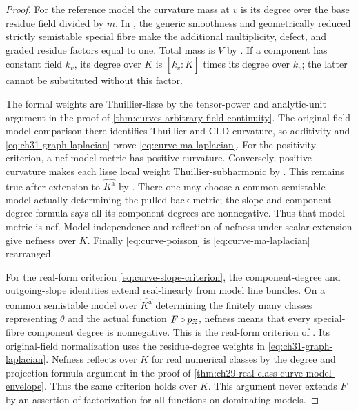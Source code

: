 \begin{proof}
For the reference model the curvature mass at \(v\) is its degree
over the base residue field divided by \(m\).
In \cite[Theorem~18.5.5 and Proposition~18.5.6(a)--(c)]{CLD25},
the generic smoothness and geometrically reduced strictly semistable
special fibre make the additional multiplicity, defect, and graded
residue factors equal to one.  Total mass is \(V\) by
\cite[Theorem~18.3.11]{CLD25}.
If a component has constant field \(k_v\), its degree over
\(\widetilde K\) is \([k_v:\widetilde K]\) times its degree over
\(k_v\); the latter cannot be substituted without this factor.

The formal weights are Thuillier-lisse by the tensor-power and
analytic-unit argument in the proof of
\cref{thm:curves-arbitrary-field-continuity}.
The original-field model comparison there identifies Thuillier and
CLD curvature, so additivity and \eqref{eq:ch31-graph-laplacian}
prove \eqref{eq:curve-ma-laplacian}.
For the positivity criterion, a nef model metric has positive
curvature.  Conversely, positive curvature makes each lisse local
weight Thuillier-subharmonic by \cite[Theorem~3.4.12(ii)]{Thu05}.
This remains true after extension to \(\widehat{K^{\mathrm a}}\)
by \cite[Corollary~3.4.5]{Thu05}.  There one may choose a common
semistable model actually determining the pulled-back metric; the
slope and component-degree formula
\cite[Proposition~3.7]{GJKM19} says all its component degrees are
nonnegative.  Thus that model metric is nef.
Model-independence and reflection of nefness under scalar extension
\cite[Proposition~3.5 and Lemma~3.3]{GM19} give nefness over \(K\).
Finally \eqref{eq:curve-poisson} is
\eqref{eq:curve-ma-laplacian} rearranged.

For the real-form criterion \eqref{eq:curve-slope-criterion},
the component-degree and outgoing-slope identities extend real-linearly
from model line bundles.  On a common semistable model over
\(\widehat{K^{\mathrm a}}\) determining the finitely many classes
representing \(\theta\) and the actual function \(F\circ p_{\mathfrak X}\),
nefness means that every special-fibre component degree is nonnegative.
This is the real-form criterion of \cite[Proposition~3.7]{GJKM19}.
Its original-field normalization uses the residue-degree weights
in \eqref{eq:ch31-graph-laplacian}.  Nefness reflects over \(K\)
for real numerical classes by the degree and projection-formula
argument in the proof of
\cref{thm:ch29-real-class-curve-model-envelope}.
Thus the same criterion holds over \(K\).
This argument never extends \(F\) by an assertion of factorization
for all functions on dominating models.
\end{proof}

